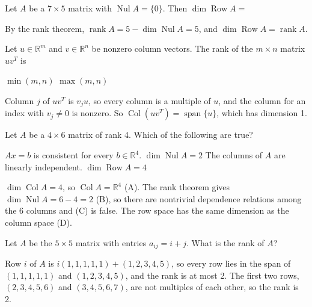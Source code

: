 \begin{question}[id=rank-11]
Let $A$ be a $7 \times 5$ matrix with $\operatorname{Nul} A = \{0\}$. Then $\dim \operatorname{Row} A =$
\begin{solution}
By the rank theorem, $\operatorname{rank} A = 5 - \dim \operatorname{Nul} A = 5$, and $\dim \operatorname{Row} A = \operatorname{rank} A$.
\end{solution}
\end{question}

\begin{question}[id=rank-12]
Let $u \in \mathbb{R}^m$ and $v \in \mathbb{R}^n$ be nonzero column vectors. The rank of the $m \times n$ matrix $uv^T$ is
\begin{options}
  \option $\min(m, n)$
  \option $\max(m, n)$
\end{options}
\begin{solution}
Column $j$ of $uv^T$ is $v_j u$, so every column is a multiple of $u$, and the column for an index with $v_j \ne 0$ is nonzero. So $\operatorname{Col}(uv^T) = \operatorname{span}\{u\}$, which has dimension 1.
\end{solution}
\end{question}

\begin{question}[id=rank-13, type=msq, marks=2]
Let $A$ be a $4 \times 6$ matrix of rank 4. Which of the following are true?
\begin{options}
  \correct $Ax = b$ is consistent for every $b \in \mathbb{R}^4$.
  \correct $\dim \operatorname{Nul} A = 2$
  \option The columns of $A$ are linearly independent.
  \correct $\dim \operatorname{Row} A = 4$
\end{options}
\begin{solution}
$\dim \operatorname{Col} A = 4$, so $\operatorname{Col} A = \mathbb{R}^4$ (A). The rank theorem gives $\dim \operatorname{Nul} A = 6 - 4 = 2$ (B), so there are nontrivial dependence relations among the 6 columns and (C) is false. The row space has the same dimension as the column space (D).
\end{solution}
\end{question}

\begin{question}[id=rank-14, marks=2]
Let $A$ be the $5 \times 5$ matrix with entries $a_{ij} = i + j$. What is the rank of $A$?
\begin{solution}
Row $i$ of $A$ is $i(1, 1, 1, 1, 1) + (1, 2, 3, 4, 5)$, so every row lies in the span of $(1, 1, 1, 1, 1)$ and $(1, 2, 3, 4, 5)$, and the rank is at most 2. The first two rows, $(2, 3, 4, 5, 6)$ and $(3, 4, 5, 6, 7)$, are not multiples of each other, so the rank is 2.
\end{solution}
\end{question}

